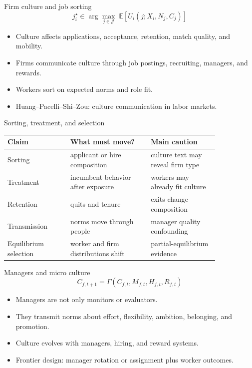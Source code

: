 \documentclass[aspectratio=169,11pt]{beamer}
\begin{document}
\begin{frame}{Firm culture and job sorting}
\[
j_i^\star \in \arg\max_{j \in \mathcal{J}}
 \; \mathbb{E}\!\left[U_i(j; X_i, N_j, C_j)\right]
\]

\begin{itemize}
    \item Culture affects applications, acceptance, retention, match quality, and mobility.
    \item Firms communicate culture through job postings, recruiting, managers, and rewards.
    \item Workers sort on expected norms and role fit.
    \item Huang--Pacelli--Shi--Zou: culture communication in labor markets.
\end{itemize}
\end{frame}

\begin{frame}{Sorting, treatment, and selection}
\small
\begin{tabular}{p{0.25\linewidth} p{0.32\linewidth} p{0.27\linewidth}}
\toprule
Claim & What must move? & Main caution \\
\midrule
Sorting & applicant or hire composition & culture text may reveal firm type \\
Treatment & incumbent behavior after exposure & workers may already fit culture \\
Retention & quits and tenure & exits change composition \\
Transmission & norms move through people & manager quality confounding \\
Equilibrium selection & worker and firm distributions shift & partial-equilibrium evidence \\
\bottomrule
\end{tabular}
\end{frame}

\begin{frame}{Managers and micro culture}
\[
C_{f,t+1} = \Gamma\!\left(C_{f,t}, M_{f,t}, H_{f,t}, R_{f,t}\right)
\]

\begin{itemize}
    \item Managers are not only monitors or evaluators.
    \item They transmit norms about effort, flexibility, ambition, belonging, and promotion.
    \item Culture evolves with managers, hiring, and reward systems.
    \item Frontier design: manager rotation or assignment plus worker outcomes.
\end{itemize}
\end{frame}
\end{document}
